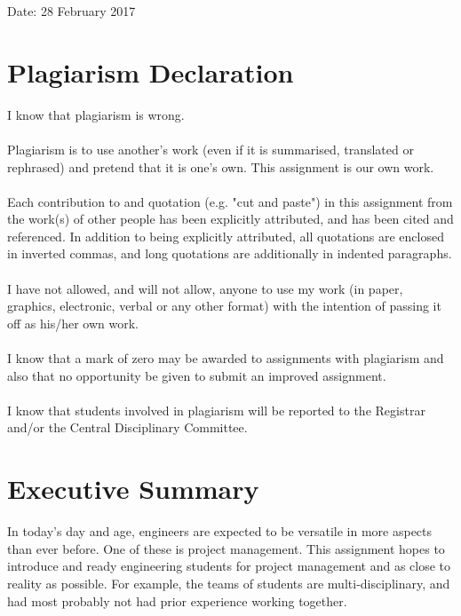 \begin{titlepage}
\begin{center}
            \large
            Date: 28 February 2017
            
        \end{center}
\end{titlepage}

\newpage



\section*{Plagiarism Declaration}

I know that plagiarism is wrong.\\\\
\noindent
Plagiarism is to use another's work (even if it is summarised, translated or rephrased) and pretend that it is one's own. This assignment is our own work.\\\\
\noindent
Each contribution to and quotation (e.g. "cut and paste") in this assignment from the work(s) of other people has been explicitly attributed, and has been cited and referenced. In addition to being explicitly attributed, all quotations are enclosed in inverted commas, and long quotations are additionally in indented paragraphs.\\\\
\noindent
I have not allowed, and will not allow, anyone to use my work (in paper, graphics, electronic, verbal or any other format) with the intention of passing it off as his/her own work.\\\\
\noindent
I know that a mark of zero may be awarded to assignments with plagiarism and also that no opportunity be given to submit an improved assignment.\\\\
\noindent
I know that students involved in plagiarism will be reported to the Registrar and/or the Central Disciplinary Committee.

\section*{Executive Summary}
In today's day and age, engineers are expected to be versatile in more aspects than ever before. One of these is project management. This assignment hopes to introduce and ready engineering students for project management and as close to reality as possible. For example, the teams of students are multi-disciplinary, and had most probably not had prior experience working together.\\

